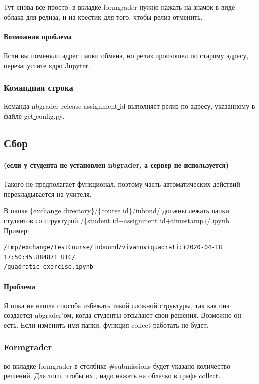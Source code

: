 \documentclass[a4paper,12pt]{article}
\begin{document}
Тут снова все просто: в вкладке formgrader нужно нажать на значок в виде облака для релиза, и на крестик для того, чтобы релиз отменить. 
\paragraph{Возможная проблема}
Если вы поменяли адрес папки обмена, но релиз произошел по старому адресу, перезапустите ядро Jupyter.
\subsubsection{Командная строка}

Команда nbgrader release assignment\underline{ }id выполняет релиз по адресу, указанному в файле get\underline{ }config.py.
\subsection{Сбор}

\paragraph{(если у студента не установлен nbgrader, а сервер не используется)}
Такого не предполагает функционал, поэтому часть автоматических действий перекладывается на учителя.

В папке
 \{exchange\underline{ }directory\}/\{course\underline{ }id\}/inbond/ должны лежать папки студентов со структурой
/\{student\underline{ }id+assignment\underline{ }id+timestamp\}/.ipynb
\\Пример: 
\begin{verbatim}
/tmp/exchange/TestCourse/inbound/vivanov+quadratic+2020-04-18 17:50:45.884871 UTC/
/quadratic_exercise.ipynb
\end{verbatim}
\paragraph{Проблема}Я пока не нашла способа избежать такой сложной структуры, так как она создается nbgrader'ом, когда студенты отсылают свои решения. Возможно он есть. Если изменить имя папки, функция collect работать не будет.
\subsubsection{Formgrader}

во вкладке formgrader в столбике \#submissions будет указано количество решений. Для того, чтобы их \grqq, надо нажать на облачко в графе collect.
\end{document}
